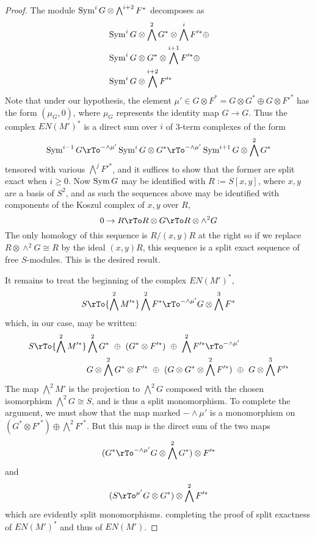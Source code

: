 \begin{proof}
The module
$ \operatorname{Sym}^{i} G \otimes \bigwedge^{i+2}  F^*$
decomposes as
\begin{align*}
&\operatorname{Sym}^{i} G \otimes \bigwedge^2 G^* \otimes \bigwedge^{i} F'^*\oplus \\
&\operatorname{Sym}^{i} G \otimes  G^*\otimes \bigwedge^{i+1} F'^* \oplus \\
&\operatorname{Sym}^{i} G \otimes  \bigwedge^{i+2} F'^* 
\end{align*}
Note that under our hypothesis, the element $\mu' \in G\otimes F^* = G\otimes G^* \oplus G\otimes F'^*$
has the form $(\mu_G, 0)$, where $\mu_G$ represents the identity map $G \to G$. Thus the complex
$EN(M')^*$ is a direct sum over $i$ of 3-term complexes of the form
$$
\Sym^{i-1} G 
\rTo^{-\wedge \mu'} 
\Sym^{i} G \otimes  G^*
\rTo^{-\wedge \mu'} 
\Sym^{i+1} G \otimes \bigwedge^2 G^* 
$$
tensored with various $\bigwedge^j F'^*$, and it suffices to show that the former are split exact when
$i\geq 0$. Now $\operatorname{Sym} G$ may be identified with $R:= S[x,y]$, where $x,y$ are a basis of $S^2$, and
as such the sequences above may be identified with components of the Koszul complex of $x,y$ over $R$,
$$
0\to R \rTo R\otimes G \rTo R\otimes \wedge^2 G
$$
The only homology of this sequence is $R/(x,y)R$ at the right so if we replace  $R\otimes \wedge^2 G \cong R$ by the ideal $(x,y)R$, this sequence is a split exact sequence of free $S$-modules. This is the desired result.

It remains to treat the beginning of the complex $EN(M')^*$,
$$
S \rTo{\bigwedge^2 M'^*} 
 \bigwedge^2 F^*
 \rTo^{-\wedge \mu'}
G\otimes \bigwedge^3 F^*
$$
which, in our case, may be written:
\begin{align*}
S \rTo{\bigwedge^2 M'^*} 
 &\bigwedge^2 G^* \ \oplus\ (G^*\otimes F'^*)\ \oplus\ \bigwedge^2 F'^*
 \rTo^{-\wedge \mu'} \\
 &G\otimes \bigwedge^2 G^*\otimes F'^*\ \oplus\ (G\otimes G^*\otimes \bigwedge^2 F'^*)\ \oplus\ G\otimes \bigwedge^3 F'^*
\end{align*}
The map $\bigwedge^2 M'$ is the projection to $\bigwedge^2 G$ composed with the chosen isomorphism
$\bigwedge^2 G \cong S$, and is thus a split monomorphism. To complete the argument, we must show that
 the map marked $-\wedge \mu'$ is a monomorphism on $(G^*\otimes F'^*) \oplus \bigwedge^2 F'^*$.
 But this map is the direct sum of the two maps
  $$
 (G^* \rTo^{-\wedge \mu'} G\otimes \bigwedge^2 G^*)  \otimes F'^*
 $$
 and
 $$
(S  \rTo^{\mu'} G\otimes G^*) \otimes \bigwedge^2 F'^*
 $$
 which are evidently split monomorphisms. 
completing the proof of split exactness of $EN(M')^*$ and thus of $EN(M')$.



\end{proof}
